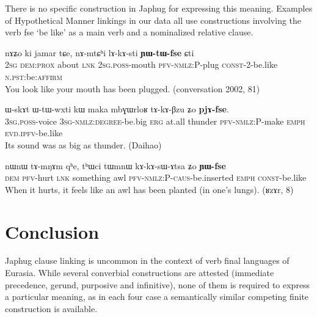 \documentclass[oldfontcommands,oneside,a4paper,11pt]{article}
\newcommand{\ipa}[1]{{\phon \mbox{#1}}} %
\begin{document}
There is no specific construction in Japhug for expressing this meaning. Examples of Hypothetical Manner linkings in our data all use constructions involving the verb \ipa{fse} `be like' as a main verb and a nominalized relative clause.

\begin{exe}
\ex \label{ex:lAkAsti.YWtWfse}
\gll
\ipa{nɤʑo}         	\ipa{ki}         	\ipa{jamar}         	\ipa{tɕe,}         	\ipa{nɤ-mtɕʰi}         	\ipa{lɤ-kɤ-sti}         	\ipa{\textbf{ɲɯ-tɯ-fse}}         	\ipa{ɕti}     \\    
\textsc{2sg} \textsc{dem:prox} about \textsc{lnk} \textsc{2sg.poss}-mouth \textsc{pfv-nmlz:P}-plug \textsc{const}-2-be.like \textsc{n.pst}:be:\textsc{affirm} \\
\glt You look like your mouth has been plugged. (conversation 2002, 81)
\end{exe}


\begin{exe}
\ex \label{ex:mbGWrloR.tAkABzu}
\gll
      	\ipa{ɯ-skɤt}         	\ipa{ɯ-tɯ-wxti}         	\ipa{kɯ}         	\ipa{maka}         	\ipa{mbɣɯrloʁ}         	\ipa{tɤ-kɤ-βzu}         	\ipa{ʑo}         	\ipa{\textbf{pjɤ-fse}.}         \\
  \textsc{3sg.poss}-voice \textsc{3sg-nmlz:degree}-be.big \textsc{erg} at.all thunder \textsc{pfv-nmlz:P}-make \textsc{emph} \textsc{evd.ipfv}-be.like \\
\glt Its sound was as big as thunder.  (Daihao)
\end{exe}
\begin{exe}
\ex \label{ex:tWmnW.tAkAsAtsa}
\gll
\ipa{nɯnɯ}         	\ipa{tɤ-mŋɤm}         	\ipa{qʰe,}         	\ipa{tʰɯci}         	\ipa{tɯmnɯ}         	\ipa{kɤ-kɤ-sɯ-ɤtsa}         	\ipa{ʑo}         	\ipa{\textbf{ɲɯ-fse}}         \\
\textsc{dem} \textsc{pfv}-hurt \textsc{lnk} something awl \textsc{pfv-nmlz:P-caus}-be.inserted  \textsc{emph} \textsc{const}-be.like \\
\glt  When it hurts, it feels like an awl has been planted (in one's lungs).  (ʁzɤr, 8)
\end{exe}

\section{Conclusion}
Japhug clause linking is uncommon in the context of verb final languages of Eurasia. While  several converbial constructions are attested (immediate precedence, gerund, purposive and infinitive), none of them is required to express a particular meaning, as in each four case a semantically similar competing finite construction is available.
\end{document}
